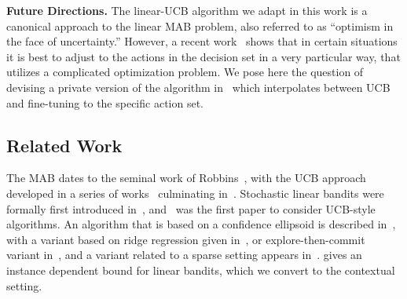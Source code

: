 \documentclass{article}
\renewcommand{\paragraph}[1]{\vspace{2pt}\noindent\textbf{#1}}
\begin{document}
\paragraph{Future Directions.} The linear-UCB algorithm we adapt in this work is a canonical approach to the linear MAB problem, also referred to as ``optimism in the face of uncertainty.'' However, a recent work~\cite{LattimoreS17} shows that in certain situations it is best to adjust to the actions in the decision set in a very particular way, that utilizes a complicated optimization problem. We pose here the question of devising a private version of the algorithm in~\cite{LattimoreS17} which interpolates between UCB and fine-tuning to the specific action set.
\vspace{-0.5mm}
\subsection{Related Work}
\label{subsec:related_work}
The MAB dates to the seminal work of Robbins~\cite{robbins1952}, with the UCB approach developed in a series of works~\cite{BanditBook85,Agrawal95} culminating in~\cite{Auer2002}.  Stochastic linear bandits were formally first introduced in~\cite{Abe2003}, and~\cite{Auer2003UCB} was the first paper to consider UCB-style algorithms. An algorithm that is based on a confidence ellipsoid is described in~\cite{DaniStochasticLinearOptimization2008}, with a variant based on ridge regression given in~\cite{ChuLRS11}, or explore-then-commit variant in~\cite{RusmevichientongT10}, and a variant related to a sparse setting appears in~\cite{Abbasi-YadkoriPS12}. \cite{AbbasiYadkoriImprovedAlgorithmsLinear2011} gives an instance dependent bound for linear bandits, which we convert to the contextual setting.
\end{document}
